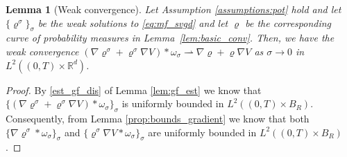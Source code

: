 \documentclass[reqno, 11pt]{amsart}
\numberwithin{equation}{section}
\newtheorem{lem}[thm]{Lemma}
\theoremstyle{definition}
\begin{document}
\begin{lem}[Weak convergence]\label{lem:weak_convergences}
    Let Assumption \ref{assumptions:pot} hold and let $\{\varrho^\sigma\}_\sigma$ be the weak solutions to \eqref{eq:mf_svgd} and let $\varrho$ be the corresponding curve of probability measures in Lemma~\ref{lem:basic_conv}. Then, we have the weak convergence $(\nabla\varrho^\sigma+\varrho^\sigma\nabla V)\ast\omega_\sigma\rightharpoonup \nabla\varrho+\varrho\nabla V$ as $\sigma\rightarrow 0$ in $L^2((0,T)\times \mathbb{R}^{d})$.
\end{lem}
\begin{proof}
    By \ref{est_gf_dis} of Lemma \ref{lem:gf_est} we know that $\{(\nabla\varrho^\sigma+\varrho^\sigma\nabla V)\ast\omega_\sigma\}_\sigma$ is uniformly bounded in $L^2((0,T)\times B_R)$. Consequently, from Lemma \ref{prop:bounds_gradient} we know that both $\{\nabla\varrho^\sigma\ast\omega_\sigma\}_\sigma$ and $\{\varrho^\sigma\nabla V\ast\omega_\sigma\}_\sigma$ are uniformly bounded in $L^2((0,T)\times B_R)$.
    
    \smallskip
    

\end{proof}
\end{document}
